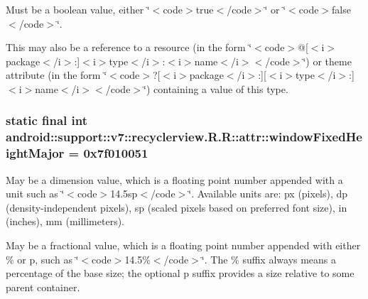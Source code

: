 Must be a boolean value, either \char`\"{}$<$code$>$true$<$/code$>$\char`\"{} or \char`\"{}$<$code$>$false$<$/code$>$\char`\"{}. 

This may also be a reference to a resource (in the form \char`\"{}$<$code$>$@\mbox{[}$<$i$>$package$<$/i$>$:\mbox{]}$<$i$>$type$<$/i$>$:$<$i$>$name$<$/i$>$$<$/code$>$\char`\"{}) or theme attribute (in the form \char`\"{}$<$code$>$?\mbox{[}$<$i$>$package$<$/i$>$:\mbox{]}\mbox{[}$<$i$>$type$<$/i$>$:\mbox{]}$<$i$>$name$<$/i$>$$<$/code$>$\char`\"{}) containing a value of this type. \hypertarget{classandroid_1_1support_1_1v7_1_1recyclerview_1_1_r_1_1attr_0a7f5585fdf01d004469e1f589b42e4a}{
\subsubsection[{windowFixedHeightMajor}]{\setlength{\rightskip}{0pt plus 5cm}static final int android::support::v7::recyclerview.R.R::attr::windowFixedHeightMajor = 0x7f010051}}
\label{classandroid_1_1support_1_1v7_1_1recyclerview_1_1_r_1_1attr_0a7f5585fdf01d004469e1f589b42e4a}


May be a dimension value, which is a floating point number appended with a unit such as \char`\"{}$<$code$>$14.5sp$<$/code$>$\char`\"{}. Available units are: px (pixels), dp (density-independent pixels), sp (scaled pixels based on preferred font size), in (inches), mm (millimeters). 

May be a fractional value, which is a floating point number appended with either \% or p, such as \char`\"{}$<$code$>$14.5\%$<$/code$>$\char`\"{}. The \% suffix always means a percentage of the base size; the optional p suffix provides a size relative to some parent container. 

